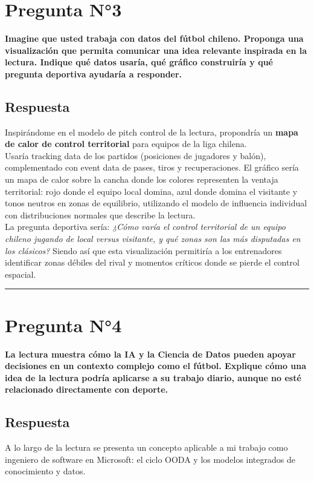 \documentclass[12pt,a4paper]{article}
\begin{document}
\section*{Pregunta N°3}
\textbf{Imagine que usted trabaja con datos del fútbol chileno. Proponga una visualización que permita comunicar una idea relevante inspirada en la lectura. Indique qué datos usaría, qué gráfico construiría y qué pregunta deportiva ayudaría a responder.}

\subsection*{Respuesta}
Inspirándome en el modelo de pitch control de la lectura, propondría un \textbf{mapa de calor de control territorial} para equipos de la liga chilena.\\

Usaría tracking data de los partidos (posiciones de jugadores y balón), complementado con event data de pases, tiros y recuperaciones. El gráfico sería un mapa de calor sobre la cancha donde los colores representen la ventaja territorial: rojo donde el equipo local domina, azul donde domina el visitante y tonos neutros en zonas de equilibrio, utilizando el modelo de influencia individual con distribuciones normales que describe la lectura.\\

La pregunta deportiva sería: \textit{¿Cómo varía el control territorial de un equipo chileno jugando de local versus visitante, y qué zonas son las más disputadas en los clásicos?} Siendo así que esta visualización permitiría a los entrenadores identificar zonas débiles del rival y momentos críticos donde se pierde el control espacial.

\vspace{0.5cm}
\hrule
\vspace{0.5cm}

\section*{Pregunta N°4}
\textbf{La lectura muestra cómo la IA y la Ciencia de Datos pueden apoyar decisiones en un contexto complejo como el fútbol. Explique cómo una idea de la lectura podría aplicarse a su trabajo diario, aunque no esté relacionado directamente con deporte.}

\subsection*{Respuesta}
A lo largo de la lectura se presenta un concepto aplicable a mi trabajo como ingeniero de software en Microsoft: el ciclo OODA y los modelos integrados de conocimiento y datos.\\
\end{document}

